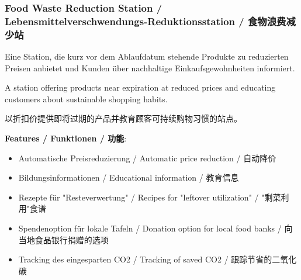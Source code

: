 \subsubsection{Food Waste Reduction Station / Lebensmittelverschwendungs-Reduktionsstation / 食物浪费减少站}

\begin{otherlanguage}{ngerman}
Eine Station, die kurz vor dem Ablaufdatum stehende Produkte zu reduzierten Preisen anbietet und Kunden über nachhaltige Einkaufsgewohnheiten informiert.
\end{otherlanguage}

A station offering products near expiration at reduced prices and educating customers about sustainable shopping habits.

以折扣价提供即将过期的产品并教育顾客可持续购物习惯的站点。

\textbf{Features / Funktionen / 功能}:
\begin{itemize}
    \item Automatische Preisreduzierung / Automatic price reduction / 自动降价
    \item Bildungsinformationen / Educational information / 教育信息
    \item Rezepte für "Resteverwertung" / Recipes for "leftover utilization" / "剩菜利用"食谱
    \item Spendenoption für lokale Tafeln / Donation option for local food banks / 向当地食品银行捐赠的选项
    \item Tracking des eingesparten CO2 / Tracking of saved CO2 / 跟踪节省的二氧化碳
\end{itemize}

